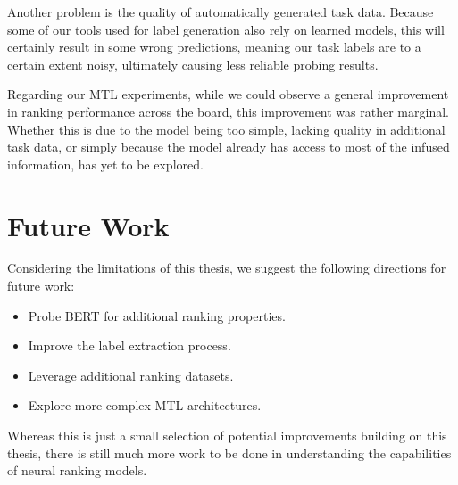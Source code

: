 Another problem is the quality of automatically generated task data. Because some of our tools used for label generation also rely on learned models, this will certainly result in some wrong predictions, meaning our task labels are to a certain extent noisy, ultimately causing less reliable probing results.

Regarding our MTL experiments, while we could observe a general improvement in ranking performance across the board, this improvement was rather marginal. Whether this is due to the model being too simple, lacking quality in additional task data, or simply because the model already has access to most of the infused information, has yet to be explored.

\section{Future Work}
\label{sec:future}
Considering the limitations of this thesis, we suggest the following directions for future work:
\begin{itemize}
    \item Probe BERT for additional ranking properties.
    \item Improve the label extraction process.
    \item Leverage additional ranking datasets.
    \item Explore more complex MTL architectures.
\end{itemize}

Whereas this is just a small selection of potential improvements building on this thesis, there is still much more work to be done in understanding the capabilities of neural ranking models.
